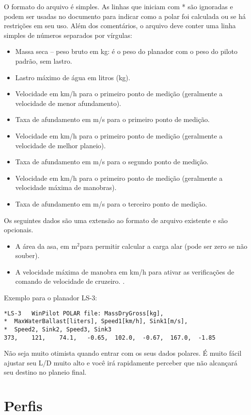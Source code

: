 O formato do arquivo é simples.  As linhas que iniciam com * são ignoradas e podem ser usadas no documento para indicar como a polar foi calculada ou se há restrições em seu uso.  Além dos comentários, o arquivo deve conter uma linha simples de números separados por vírgulas:

\begin{itemize}
\item Massa seca – peso bruto em kg:  é o peso do planador com o peso do piloto padrão, sem lastro.
\item Lastro máximo de água em litros (kg).
\item Velocidade em km/h para o primeiro ponto de medição (geralmente a velocidade de menor afundamento).
\item Taxa de afundamento em m/s para o primeiro ponto de medição.
\item Velocidade em km/h para o primeiro ponto de medição (geralmente a velocidade de melhor planeio).
\item Taxa de afundamento em m/s para o segundo ponto de medição.
\item Velocidade em km/h para o primeiro ponto de medição (geralmente a velocidade máxima de manobras).
\item Taxa de afundamento em m/s para o terceiro ponto de medição.
\end{itemize}
Os seguintes dados são uma extensão ao formato de arquivo existente e são opcionais.
\begin{itemize}
\item A área da asa, em m$^2$para permitir calcular a carga alar (pode ser zero se não souber).
\item A velocidade máxima de manobra em km/h para ativar as verificações de comando de velocidade de cruzeiro. . 
\end{itemize}

Exemplo para o planador LS-3:
\begin{verbatim}
*LS-3	WinPilot POLAR file: MassDryGross[kg], 
*  MaxWaterBallast[liters], Speed1[km/h], Sink1[m/s], 
*  Speed2, Sink2, Speed3, Sink3  	
373,	121,	74.1,	-0.65,	102.0,	-0.67,	167.0,	-1.85
\end{verbatim}

\tip Não seja muito otimista quando entrar com os seus dados polares.  É muito fácil ajustar seu L/D muito alto e você irá rapidamente perceber que não alcançará seu destino no planeio final.

\section{Perfis}

